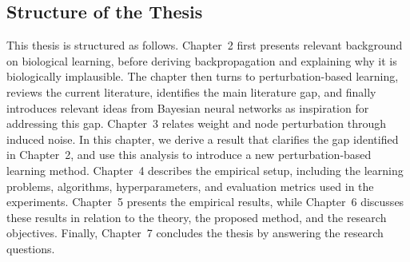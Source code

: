 \subsection{Structure of the Thesis}
This thesis is structured as follows. Chapter~2 first presents relevant background on biological learning, before deriving backpropagation and explaining why it is biologically implausible. The chapter then turns to perturbation-based learning, reviews the current literature, identifies the main literature gap, and finally introduces relevant ideas from Bayesian neural networks as inspiration for addressing this gap. Chapter~3 relates weight and node perturbation through induced noise. In this chapter, we derive a result that clarifies the gap identified in Chapter~2, and use this analysis to introduce a new perturbation-based learning method. Chapter~4 describes the empirical setup, including the learning problems, algorithms, hyperparameters, and evaluation metrics used in the experiments. Chapter~5 presents the empirical results, while Chapter~6 discusses these results in relation to the theory, the proposed method, and the research objectives. Finally, Chapter~7 concludes the thesis by answering the research questions.
